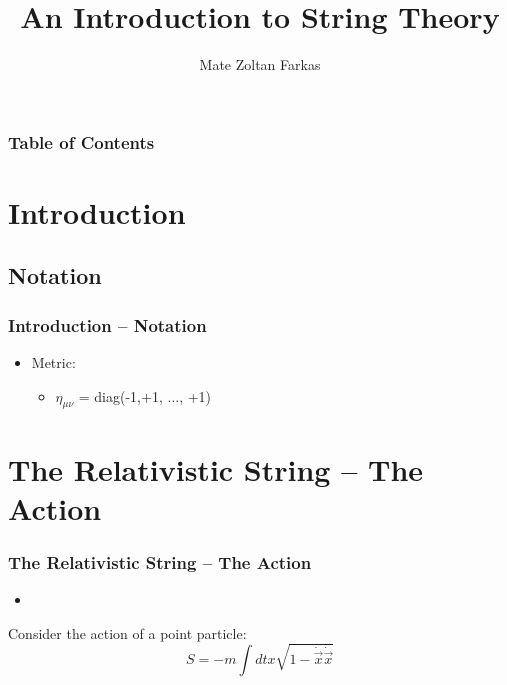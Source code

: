 \documentclass[aspectratio=169]{beamer}
\begin{document}
	
	\author{Mate Zoltan Farkas}
	\title{An Introduction to String Theory}
	
	\begin{frame}[plain]
		\maketitle
	\end{frame}
	
	\begin{frame}
		\frametitle{Table of Contents}
		\tableofcontents
	\end{frame}

	\section{Introduction}
	\subsection{Notation}
	
	\begin{frame}
		\frametitle{Introduction -- Notation}
		\begin{itemize}
			\item Metric:
			\begin{itemize}
				\item $\eta_{\mu\nu}$ = diag(-1,+1, $\dots$, +1)
			\end{itemize}
		\end{itemize}
	\end{frame}

	\section{The Relativistic String -- The Action}
	
	\begin{frame}
		\frametitle{The Relativistic String -- The Action}
		\begin{itemize}[]
			\item<1,2>[item label]
		\end{itemize}
		Consider the action of a point particle:
		\begin{equation*}
			S = -m \int dt x \sqrt{1-\dot{\vec{x}}\dot{\vec{x}}}
		\end{equation*}
	\end{frame}
	
\end{document}
